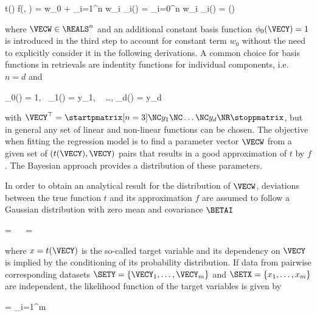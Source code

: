     \startformula
        t(\VECY) \approx f(\VECY, \VECW) = w_0 + \sum_{i=1}^n w_i \phi_i(\VECY)
            = \sum_{i=0}^n w_i \phi_i(\VECY) = \VECPHI(\VECY) \VECW \EQCOMMA
    \stopformula

    where $\VECW \in \REALS^n$ and an additional constant basis function
    $\phi_0(\VECY) = 1$ is introduced in the third step to account for constant
    term $w_0$ without the need to explicitly consider it in the following
    derivations. A common choice for basis functions in retrievals are
    indentity functions for individual components, i.e. $n = d$ and

    \startformula
        \phi_0(\VECY) = 1,~ \phi_1(\VECY) = y_1, ~ \dots, \phi_d(\VECY) = y_d
    \stopformula

    with $\VECY^\top = \startpmatrix[n=3] \NC y_1 \NC \dots \NC y_d \NR
    \stoppmatrix$, but in general any set of linear and non-linear functions
    can be chosen. The objective when fitting the regression model is to find
    a parameter vector $\VECW$ from a given set of $(t(\VECY), \VECY)$
    pairs that results in a good approximation of $t$ by $f$.
    The Bayesian approach provides a distribution of these
    parameters.

    In order to obtain an analytical result for the distribution of $\VECW$,
    deviations between the true function $t$ and its approximation $f$ are
    assumed to follow a Gaussian distribution with zero mean and covariance
    $\BETAI$

    \placeformula
    \startformula
    \startalign[n=3,align={left,right,left}]
        \NC \NC {} = \NC
                 \NR
        \NC \Rightarrow~~ \NC {} = \NC
             \EQCOMMA {}
    \stopalign
    \stopformula

    where $x = t(\VECY)$ is the so-called target variable and its
    dependency on $\VECY$ is implied by the conditioning of its probability
    distribution. If data from pairwise corresponding datasets $\SETY = \{
    \VECY_1, \dots, \VECY_m \}$ and $\SETX = \{ x_1, \dots, x_m \}$ are
    independent, the likelihood function of the target variables is given by

    \startformula
        \RLIKELIHOOD = \prod_{i=1}^{m} 
    \stopformula
    
